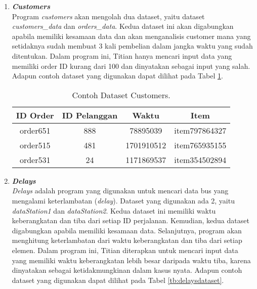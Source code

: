 \begin{enumerate}
      \item \emph{\textbf{Customers}} \\
            Program \emph{customers} akan mengolah dua dataset, yaitu dataset \emph{customers\_data} dan \emph{orders\_data}. Kedua dataset ini akan digabungkan apabila memiliki kesamaan data dan akan menganalisis customer mana yang setidaknya sudah membuat 3 kali pembelian dalam jangka waktu yang sudah ditentukan. Dalam program ini, Titian hanya mencari input data yang memiliki order ID kurang dari 100 dan dinyatakan sebagai input yang salah.
            Adapun contoh dataset yang digunakan dapat 
            dilihat pada Tabel \ref{tb:customersdataset}.

            \begin{longtable}{|c|c|c|c|}
                  \caption{Contoh Dataset Customers.}
                  \label{tb:customersdataset} \\
                  \hline
                  \rowcolor[HTML]{C0C0C0}
                  \textbf{ID Order} & \textbf{ID Pelanggan} & \textbf{Waktu} & \textbf{Item} \\
                  \hline
                  order651 & 888 & 78895039 & item797864327 \\
                  order515 & 481 & 1701910512 & item765935155 \\
                  order531 & 24 & 1171869537 & item354502894 \\
                  \hline
            \end{longtable}
            
      \item \emph{\textbf{Delays}} \\
            \emph{Delays} adalah program yang digunakan untuk mencari data bus yang mengalami keterlambatan (\emph{delay}). Dataset yang digunakan ada 2, yaitu \emph{dataStation1} dan \emph{dataStation2}. Kedua dataset ini memiliki waktu keberangkatan dan tiba dari setiap ID perjalanan. Kemudian, kedua dataset digabungkan apabila memiliki kesamaan data. Selanjutnya, program akan menghitung keterlambatan dari waktu keberangkatan dan tiba dari setiap elemen. Dalam program ini, Titian diterapkan untuk mencari input data yang memiliki waktu keberangkatan lebih besar daripada waktu tiba, karena dinyatakan sebagai ketidakmungkinan dalam kasus nyata.
            Adapun contoh dataset yang digunakan dapat 
            dilihat pada Tabel \ref{tb:delaysdataset}.


\end{enumerate}
